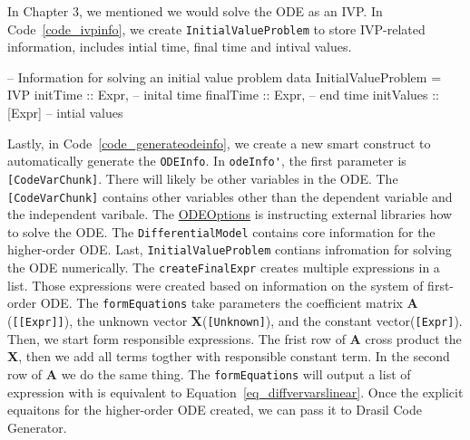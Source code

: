In Chapter 3, we mentioned we would solve the ODE as an IVP. In Code~\ref{code_ivpinfo}, we create \verb|InitialValueProblem| to store IVP-related information, includes intial time, final time and intival values.
\begin{listing}[ht]
\begin{haskell1}
-- Information for solving an initial value problem
data InitialValueProblem = IVP{
  initTime :: Expr, -- inital time
  finalTime :: Expr, -- end time
  initValues :: [Expr] -- intial values
}
\end{haskell1}
\label{code_ivpinfo}
\end{listing}

Lastly, in Code~\ref{code_generateodeinfo}, we create a new smart construct to automatically generate the \verb|ODEInfo|. In \verb|odeInfo'|, the first parameter is \verb|[CodeVarChunk]|. There will likely be other variables in the ODE. The \verb|[CodeVarChunk]| contains other variables other than the dependent variable and the independent varibale. The \href{https://jacquescarette.github.io/Drasil/docs/full/drasil-code-0.1.9.0/Language-Drasil-Data-ODEInfo.html#t:ODEOptions}{ODEOptions} is instructing external libraries how to solve the ODE. The \verb|DifferentialModel| contains core information for the higher-order ODE. Last, \verb|InitialValueProblem| contians infromation for solving the ODE numerically. The \verb|createFinalExpr| creates multiple expressions in a list. Those expressions were created based on information on the system of first-order ODE. The \verb|formEquations| take parameters the coefficient matrix \textbf{A} (\verb|[[Expr]]|), the unknown vector \textbf{X}(\verb|[Unknown]|), and the constant vector(\verb|[Expr]|). Then, we start form responsible expressions. The frist row of \textbf{A} cross product the \textbf{X}, then we add all terms togther with responsible constant term. In the second row of \textbf{A} we do the same thing. The \verb|formEquations| will output a list of expression with is equivalent to Equation~\ref{eq_diffvervarslinear}. Once the explicit equaitons for the higher-order ODE created, we can pass it to Drasil Code Generator.

